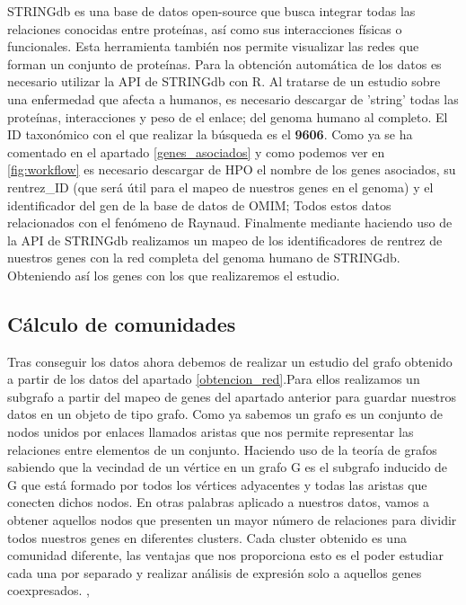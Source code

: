 STRINGdb es una base de datos open-source que busca integrar todas las relaciones conocidas entre proteínas, así como sus interacciones físicas o funcionales. Esta herramienta también nos permite visualizar las redes que forman un conjunto de proteínas. Para la obtención automática de los datos es necesario utilizar la API de STRINGdb con R. Al tratarse de un estudio sobre una enfermedad que afecta a humanos, es necesario descargar de 'string' todas las proteínas, interacciones y peso de el enlace; del genoma humano al completo. El ID taxonómico con el que realizar la búsqueda es el \textbf{9606}. Como ya se ha comentado en el apartado \ref{genes_asociados} y como podemos ver en \ref{fig:workflow} es necesario descargar de HPO el nombre de los genes asociados, su rentrez\_ID (que será útil para el mapeo de nuestros genes en el genoma) y el identificador del gen de la base de datos de OMIM; Todos estos datos relacionados con el fenómeno de Raynaud. Finalmente mediante haciendo uso de la API de STRINGdb realizamos un mapeo de los identificadores de rentrez de nuestros genes con la red completa del genoma humano de STRINGdb. Obteniendo así los genes con los que realizaremos el estudio. \cite{STRINGdb}

\subsection{Cálculo de comunidades}

Tras conseguir los datos ahora debemos de realizar un estudio del grafo obtenido a partir de los datos del apartado \ref{obtencion_red}.Para ellos realizamos un subgrafo a partir del mapeo de genes del apartado anterior para guardar nuestros datos en un objeto de tipo grafo. Como ya sabemos un grafo es un conjunto de nodos unidos por enlaces llamados aristas que nos permite representar las relaciones entre elementos de un conjunto. Haciendo uso de la teoría de grafos sabiendo que la vecindad de un vértice en un grafo G es el subgrafo inducido de G que está formado por todos los vértices adyacentes y todas las aristas que conecten dichos nodos. En otras palabras aplicado a nuestros datos, vamos a obtener aquellos nodos que presenten un mayor número de relaciones para dividir todos nuestros genes en diferentes clusters. Cada cluster obtenido es una comunidad diferente, las ventajas que nos proporciona esto es el poder estudiar cada una por separado y realizar análisis de expresión solo a aquellos genes coexpresados. \cite{Larrion2002}, \cite{Seress1995}

